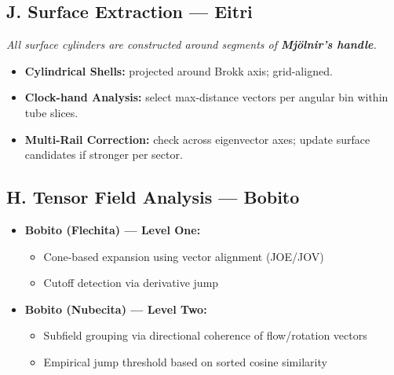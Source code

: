 \documentclass{article}
\begin{document}
\subsection*{J. Surface Extraction — Eitri}
\textit{All surface cylinders are constructed around segments of \textbf{Mjölnir’s handle}.}
\begin{itemize}[leftmargin=1.5em]
  \item \textbf{Cylindrical Shells:} projected around Brokk axis; grid-aligned.
  \item \textbf{Clock-hand Analysis:} select max-distance vectors per angular bin within tube slices.
  \item \textbf{Multi-Rail Correction:} check across eigenvector axes; update surface candidates if stronger per sector.
\end{itemize}

\subsection*{H. Tensor Field Analysis — Bobito}
\begin{itemize}[leftmargin=1.5em]
  \item \textbf{Bobito (Flechita) — Level One:}
    \begin{itemize}
      \item Cone-based expansion using vector alignment (JOE/JOV)
      \item Cutoff detection via derivative jump
    \end{itemize}
  \item \textbf{Bobito (Nubecita) — Level Two:}
    \begin{itemize}
      \item Subfield grouping via directional coherence of flow/rotation vectors
      \item Empirical jump threshold based on sorted cosine similarity
    \end{itemize}
\end{itemize}
\end{document}
